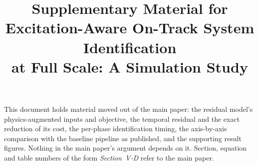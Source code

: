 \documentclass[journal]{IEEEtran}
\begin{document}
\title{Supplementary Material for\\
Excitation-Aware On-Track System Identification\\
at Full Scale: A Simulation Study}
\author{}
\maketitle
\thispagestyle{plain}\pagestyle{plain}

\noindent This document holds material moved out of the main paper: the
residual model's physics-augmented inputs and objective, the temporal residual
and the exact reduction of its cost, the per-phase identification timing, the
axis-by-axis comparison with the baseline pipeline as published, and the
supporting result figures. Nothing in the main paper's argument depends on it.
Section, equation and table numbers of the form \emph{Section~V-D} refer to the
main paper.





\end{document}
